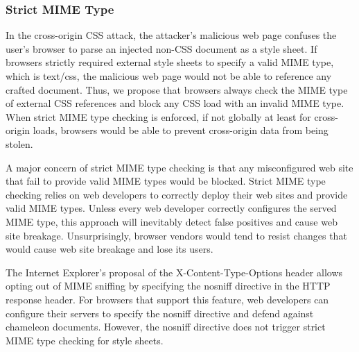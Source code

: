 \documentclass{acm_proc_article-sp}
\begin{document}
{\subsubsection{Strict MIME Type}
In the cross-origin CSS attack, the attacker's malicious web page confuses the user's browser to parse an injected non-CSS document as a style sheet. If browsers strictly required external style sheets to specify a valid MIME type, which is text/css, the malicious web page would not be able to reference any crafted document. Thus, we propose that browsers always check the MIME type of external CSS references and block any CSS load with an invalid MIME type. When strict MIME type checking is enforced, if not globally at least for cross-origin loads, browsers would be able to prevent cross-origin data from being stolen. 

A major concern of strict MIME type checking is that any misconfigured web site that fail to provide valid MIME types would be blocked. Strict MIME type checking relies on web developers to correctly deploy their web sites and provide valid MIME types. Unless every web developer correctly configures the served MIME type, this approach will inevitably detect false positives and cause web site breakage. Unsurprisingly, browser vendors would tend to resist changes that would cause web site breakage and lose its users.

The Internet Explorer's proposal of the X-Content-Type-Options header \cite{nosniff} allows opting out of MIME sniffing by specifying the nosniff directive in the HTTP response header. For browsers that support this feature, web developers can configure their servers to specify the nosniff directive and defend against chameleon documents. However, the nosniff directive does not trigger strict MIME type checking for style sheets.

}
\end{document}

